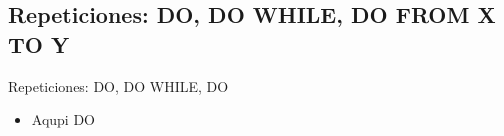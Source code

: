 
\subsection{Repeticiones: DO, DO WHILE, DO FROM X TO Y}


\begin{frame}[fragile]{Repeticiones: DO, DO WHILE, DO}  
 \begin{itemize}[<+(0)->]
  \item Aqupi DO 
  
  
 \end{itemize}
\end{frame}



